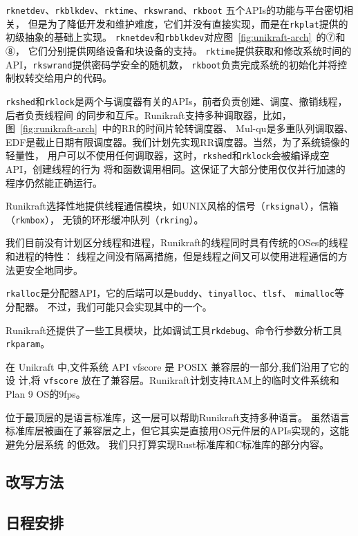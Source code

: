 \documentclass[UTF8,fontset=none,linespread=1.15]{ctexart}
\begin{document}
\texttt{rknetdev}、\texttt{rkblkdev}、\texttt{rktime}、\texttt{rkswrand}、\texttt{rkboot}
五个APIs的功能与平台密切相关，
但是为了降低开发和维护难度，它们并没有直接实现，而是在\texttt{rkplat}提供的初级抽象的基础上实现。
\texttt{rknetdev}和\texttt{rbblkdev}对应图\ \ref{fig:unikraft-arch}\ 的⑦和⑧，
它们分别提供网络设备和块设备的支持。
\texttt{rktime}提供获取和修改系统时间的API，\texttt{rkswrand}提供密码学安全的随机数，
\texttt{rkboot}负责完成系统的初始化并将控制权转交给用户的代码。

\texttt{rkshed}和\texttt{rklock}是两个与调度器有关的APIs，前者负责创建、调度、撤销线程，后者负责线程间
的同步和互斥。Runikraft支持多种调取器，比如，图\ \ref{fig:runikraft-arch}\ 中的RR的时间片轮转调度器、
Mul-qu是多重队列调取器、EDF是截止日期有限调度器。我们计划先实现RR调度器。当然，为了系统镜像的轻量性，
用户可以不使用任何调取器，这时，\texttt{rkshed}和\texttt{rklock}会被编译成空API，创建线程的行为
将和函数调用相同。这保证了大部分使用仅仅并行加速的程序仍然能正确运行。

Runikraft选择性地提供线程通信模块，如UNIX风格的信号（\texttt{rksignal}），信箱（\texttt{rkmbox}），
无锁的环形缓冲队列（\texttt{rkring}）。

我们目前没有计划区分线程和进程，Runikraft的线程同时具有传统的OSes的线程和进程的特性：
线程之间没有隔离措施，但是线程之间又可以使用进程通信的方法更安全地同步。

\texttt{rkalloc}是分配器API，它的后端可以是\texttt{buddy}、\texttt{tinyalloc}、\texttt{tlsf}、
\texttt{mimalloc}等分配器。
不过，我们可能只会实现其中的一个。

Runikraft还提供了一些工具模块，比如调试工具\texttt{rkdebug}、命令行参数分析工具\texttt{rkparam}。

在 Unikraft 中,文件系统 API vfscore 是 POSIX 兼容层的一部分,我们沿用了它的设
计,将 \texttt{vfscore} 放在了兼容层。Runikraft计划支持RAM上的临时文件系统和Plan 9 OS的9fps。

位于最顶层的是语言标准库，这一层可以帮助Runikraft支持多种语言。
虽然语言标准库层被画在了兼容层之上，但它其实是直接用OS元件层的APIs实现的，这能避免分层系统
的低效。
我们只打算实现Rust标准库和C标准库的部分内容。

\subsection{改写方法}

\subsection{日程安排}
\end{document}
